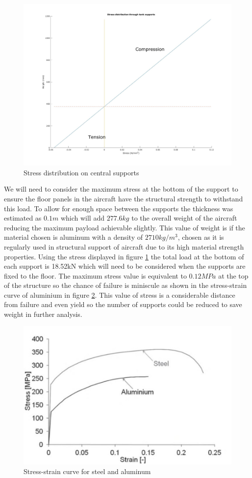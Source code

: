 \begin{figure}[!htbp]
\centering
\includegraphics[width= \linewidth]{../figures/stress_distribution_on_central_supports.jpg}
\caption{Stress distribution on central supports}
  \label{fig:stress_distribution_on_central_supports}
\end{figure}
\FloatBarrier

We will need to consider the maximum stress at the bottom of the support to ensure the floor panels in the aircraft have the structural strength to withstand this load. To allow for enough space between the supports the thickness was estimated as $0.1m$ which will add $277.6kg$ to the overall weight of the aircraft reducing the maximum payload achievable slightly. This value of weight is if the material chosen is aluminum with a density of $2710kg/m^3$, chosen as it is regularly used in structural support of aircraft due to its high material strength properties.
Using the stress displayed in figure \ref{fig:stress_distribution_on_central_supports} the total load at the bottom of each support is 18.52kN which will need to be considered when the supports are fixed to the floor.
The maximum stress value is equivalent to $0.12 MPa$ at the top of the structure so the chance of failure is miniscule as shown in the stress-strain curve of aluminium in figure \ref{fig:stress_strain_steel_al}. This value of stress is a considerable distance from failure and even yield so the number of supports could be reduced to save weight in further analysis. 

\begin{figure}[!htbp]
\centering
\includegraphics[width= \linewidth]{../figures/stress_strain_steel_al.jpg}
  \caption{Stress-strain curve for steel and aluminum \cite{liu2013failure}}
  \label{fig:stress_strain_steel_al}
\end{figure}
\FloatBarrier

